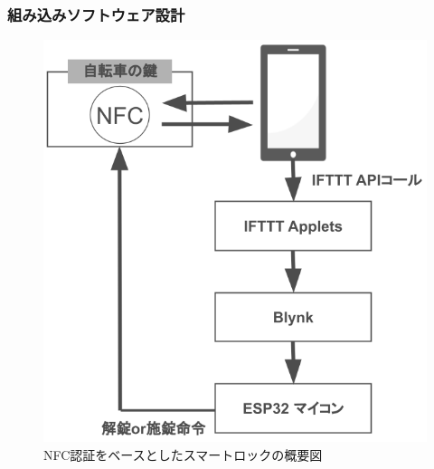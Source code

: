       \subsubsection{組み込みソフトウェア設計}
        \label{sec:組み込みソフトウェア設計}
        
          \begin{figure}[b!]
            \centering
            \includegraphics[scale=0.36]
            {figures/overallImageOfNfcUnlock.png}
            \caption{NFC認証をベースとしたスマートロックの概要図}
            \label{fig:NFC認証をベースとしたスマートロックの概要図}
          \end{figure}
          

